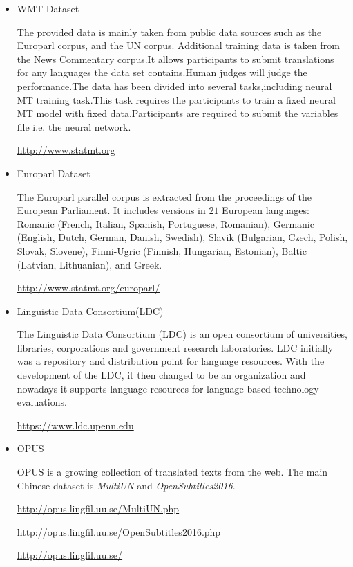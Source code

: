 \documentclass[a4paper, 12pt]{article}
\begin{document}
\begin{itemize}
	\item WMT Dataset
	
	The provided data is mainly taken from public data sources such as the Europarl corpus, and the UN corpus. Additional training data is taken from the News Commentary corpus.It allows participants to submit translations for any languages the data set contains.Human judges will judge the performance.The data has been divided into several tasks,including neural MT training task.This task requires the participants to train a fixed neural MT model with fixed data.Participants are required to submit the variables file i.e. the neural network.
	
	\url{http://www.statmt.org}	
	
	\item Europarl Dataset\cite{europarl}
    
    The Europarl parallel corpus is extracted from the proceedings of the European Parliament. It includes versions in $21$ European languages: Romanic (French, Italian, Spanish, Portuguese, Romanian), Germanic (English, Dutch, German, Danish, Swedish), Slavik (Bulgarian, Czech, Polish, Slovak, Slovene), Finni-Ugric (Finnish, Hungarian, Estonian), Baltic (Latvian, Lithuanian), and Greek.

	\url{http://www.statmt.org/europarl/}

	\item Linguistic Data Consortium(LDC)
	
	The Linguistic Data Consortium (LDC) is an open consortium of universities, libraries, corporations and government research laboratories. LDC initially was a repository and distribution point for language resources. With the development of the LDC, it then changed to be an organization and nowadays it supports language resources for language-based technology evaluations.
	
	\url{https://www.ldc.upenn.edu}

	\item OPUS\cite{TIEDEMANN12.463}
	
	OPUS is a growing collection of translated texts from the web. The main Chinese dataset is \textsl{MultiUN} and \textsl{OpenSubtitles2016}.
	
	\url{http://opus.lingfil.uu.se/MultiUN.php}	
	
	\url{http://opus.lingfil.uu.se/OpenSubtitles2016.php}	

	\url{http://opus.lingfil.uu.se/}	
		

\end{itemize}
\end{document}
